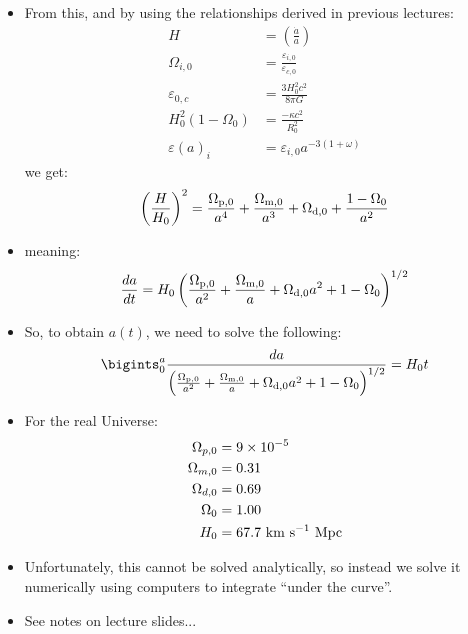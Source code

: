 \documentclass[11pt]{article}
\begin{document}
\begin{itemize}
\item From this, and by using the relationships derived in previous lectures:
\begin{align}
    H &= \left(\frac{\dot{a}}{a}\right)\\
    \Omega_{i,0}&=\frac{\varepsilon{_{i,0}}}{\varepsilon{_{c,0}}}\\
    \varepsilon{_{0,c}}&=\frac{3H_0^2c^2}{8\pi G}\\
    H_0^2(1-\Omega_0)&= \frac{-\kappa c^2}{R_0^2}\\
    \varepsilon{(a)_i}&=\varepsilon{_{i,0}}a^{-3(1+\omega)}
\end{align}
we get:
\begin{equation}
\left(\frac{H}{H_0}\right)^2=\frac{\Omega_{\rm p, 0}}{a^4}+\frac{\Omega_{\rm m, 0}}{a^3} + \Omega_{\rm d, 0} + \frac{1-\Omega_0}{a^2}
\end{equation}
\item meaning:
\begin{equation}
    \frac{da}{dt}=H_0\left(\frac{\Omega_{\rm p, 0}}{a^2}+\frac{\Omega_{\rm m, 0}}{a} + \Omega_{\rm d, 0}a^2 + 1-\Omega_0\right)^{1/2}
\end{equation}
\item So, to obtain $a(t)$, we need to solve the following:
\begin{equation}
        \bigints_0^a{\frac{da}{\left(\frac{\Omega_{\rm p, 0}}{a^2}+\frac{\Omega_{\rm m, 0}}{a} + \Omega_{\rm d, 0}a^2 + 1-\Omega_0\right)^{1/2}}} = H_0t
\end{equation}
\item For the real Universe:
\begin{align}
\Omega_{p,0}&=9\times10^{-5}\\
\Omega_{m,0}&=0.31\\
\Omega_{d,0}&=0.69\\
\Omega_{0}&=1.00\\
H_0 &= 67.7~{\rm km~s^{-1}~Mpc}
\end{align}
\item Unfortunately, this cannot be solved analytically, so instead we solve it numerically using computers to integrate ``under the curve''.
\item See notes on lecture slides...
\end{itemize}
\end{document}
